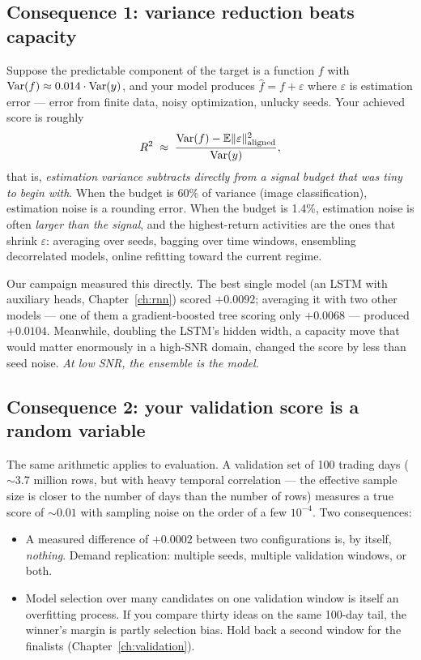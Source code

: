 \subsection{Consequence 1: variance reduction beats capacity}

Suppose the predictable component of the target is a function $f$ with
$\operatorname{Var}(f) \approx 0.014 \cdot \operatorname{Var}(y)$, and your model produces
$\hat f = f + \varepsilon$ where $\varepsilon$ is estimation error ---
error from finite data, noisy optimization, unlucky seeds. Your achieved
score is roughly
\[
R^2 \;\approx\; \frac{\operatorname{Var}(f) - \mathbb{E}\|\varepsilon\|^2_{\text{aligned}}}{\operatorname{Var}(y)},
\]
that is, \emph{estimation variance subtracts directly from a signal budget
that was tiny to begin with}. When the budget is 60\% of variance (image
classification), estimation noise is a rounding error. When the budget is
1.4\%, estimation noise is often \emph{larger than the signal}, and the
highest-return activities are the ones that shrink $\varepsilon$: averaging
over seeds, bagging over time windows, ensembling decorrelated models,
online refitting toward the current regime.

Our campaign measured this directly. The best single model (an LSTM with
auxiliary heads, Chapter~\ref{ch:rnn}) scored $+0.0092$; averaging it with
two other models --- one of them a gradient-boosted tree scoring only
$+0.0068$ --- produced $+0.0104$. Meanwhile, doubling the LSTM's hidden
width, a capacity move that would matter enormously in a high-SNR domain,
changed the score by less than seed noise. \emph{At low SNR, the ensemble is
the model.}

\subsection{Consequence 2: your validation score is a random variable}

The same arithmetic applies to evaluation. A validation set of 100 trading
days ($\sim$3.7 million rows, but with heavy temporal correlation --- the
effective sample size is closer to the number of days than the number of
rows) measures a true score of $\sim 0.01$ with sampling noise on the order
of a few $10^{-4}$. Two consequences:

\begin{itemize}
\item A measured difference of $+0.0002$ between two configurations is,
  by itself, \emph{nothing}. Demand replication: multiple seeds, multiple
  validation windows, or both.
\item Model selection over many candidates on one validation window is
  itself an overfitting process. If you compare thirty ideas on the same
  100-day tail, the winner's margin is partly selection bias. Hold back a
  second window for the finalists (Chapter~\ref{ch:validation}).
\end{itemize}

